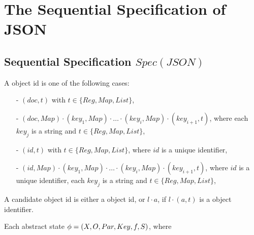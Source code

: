 
\section{The Sequential Specification of JSON}
\label{sec:the sequential specification of JSON}


\subsection{Sequential Specification $\mathit{Spec}(\mathit{JSON})$}
\label{subsec:sequential specification Spec(JSON)}

A object id is one of the following cases:

\begin{itemize}
\setlength{\itemsep}{0.5pt}
\item[-] $(\mathit{doc},t)$ with $t \in \{ \mathit{Reg}, \mathit{Map}, \mathit{List} \}$,

\item[-] $(\mathit{doc},\mathit{Map}) \cdot (\mathit{key}_1,\mathit{Map}) \cdot \ldots \cdot (\mathit{key}_i,\mathit{Map}) \cdot (\mathit{key}_{\mathit{i+1}},t)$, where each $\mathit{key}_j$ is a string and $t \in \{ \mathit{Reg}, \mathit{Map}, \mathit{List} \}$,

\item[-] $(\mathit{id},t)$ with $t \in \{ \mathit{Reg}, \mathit{Map}, \mathit{List} \}$, where $\mathit{id}$ is a unique identifier,

\item[-] $(\mathit{id},\mathit{Map}) \cdot (\mathit{key}_1,\mathit{Map}) \cdot \ldots \cdot (\mathit{key}_i,\mathit{Map}) \cdot (\mathit{key}_{\mathit{i+1}},t)$, where $\mathit{id}$ is a unique identifier, each $\mathit{key}_j$ is a string and $t \in \{ \mathit{Reg}, \mathit{Map}, \mathit{List} \}$,
\end{itemize}

A candidate object id is either a object id, or $l \cdot a$, if $l \cdot (a,t)$ is a object identifier.

Each abstract state $\phi = (X,O,Par,Key,f,S)$, where

